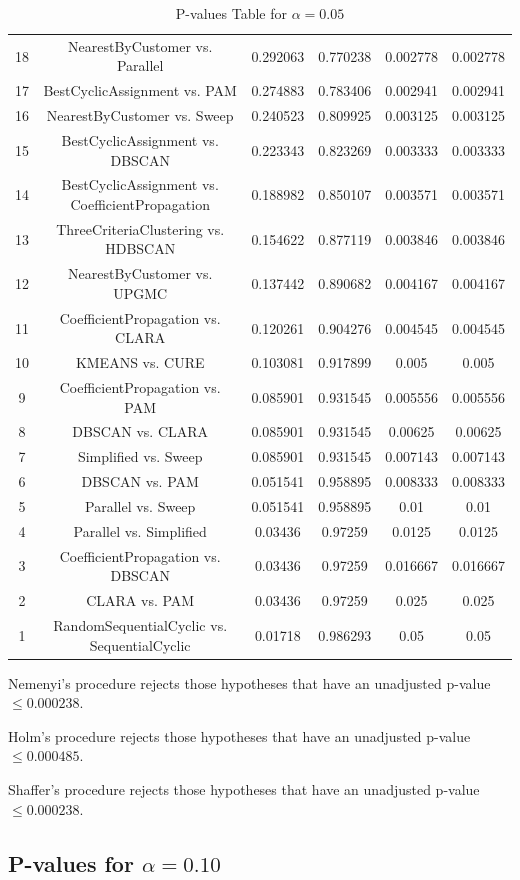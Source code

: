\documentclass[a4paper,10pt]{article}
\begin{document}
\begin{landscape}
\begin{table}[!htp]
\begin{tabular}{cccccc}
18&NearestByCustomer vs. Parallel&0.292063&0.770238&0.002778&0.002778\\
17&BestCyclicAssignment vs. PAM&0.274883&0.783406&0.002941&0.002941\\
16&NearestByCustomer vs. Sweep&0.240523&0.809925&0.003125&0.003125\\
15&BestCyclicAssignment vs. DBSCAN&0.223343&0.823269&0.003333&0.003333\\
14&BestCyclicAssignment vs. CoefficientPropagation&0.188982&0.850107&0.003571&0.003571\\
13&ThreeCriteriaClustering vs. HDBSCAN&0.154622&0.877119&0.003846&0.003846\\
12&NearestByCustomer vs. UPGMC&0.137442&0.890682&0.004167&0.004167\\
11&CoefficientPropagation vs. CLARA&0.120261&0.904276&0.004545&0.004545\\
10&KMEANS vs. CURE&0.103081&0.917899&0.005&0.005\\
9&CoefficientPropagation vs. PAM&0.085901&0.931545&0.005556&0.005556\\
8&DBSCAN vs. CLARA&0.085901&0.931545&0.00625&0.00625\\
7&Simplified vs. Sweep&0.085901&0.931545&0.007143&0.007143\\
6&DBSCAN vs. PAM&0.051541&0.958895&0.008333&0.008333\\
5&Parallel vs. Sweep&0.051541&0.958895&0.01&0.01\\
4&Parallel vs. Simplified&0.03436&0.97259&0.0125&0.0125\\
3&CoefficientPropagation vs. DBSCAN&0.03436&0.97259&0.016667&0.016667\\
2&CLARA vs. PAM&0.03436&0.97259&0.025&0.025\\
1&RandomSequentialCyclic vs. SequentialCyclic&0.01718&0.986293&0.05&0.05\\
\hline
\end{tabular}
\caption{P-values Table for $\alpha=0.05$}
\end{table}Nemenyi's procedure rejects those hypotheses that have an unadjusted p-value $\le0.000238$.

Holm's procedure rejects those hypotheses that have an unadjusted p-value $\le0.000485$.

Shaffer's procedure rejects those hypotheses that have an unadjusted p-value $\le0.000238$.

\pagebreak

\subsection{P-values for $\alpha=0.10$}


\end{landscape}
\end{document}
